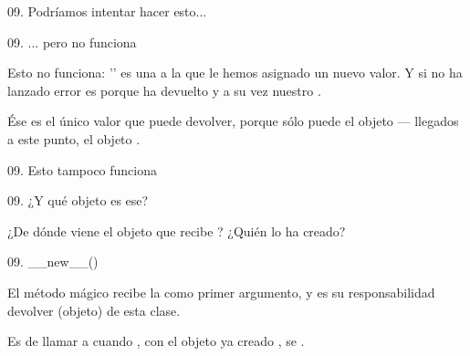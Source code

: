 \begin{frame}{09. Podríamos intentar hacer esto...}
  \footnotesize
\end{frame}

\begin{frame}{09. ... pero no funciona}
  \begin{center}
    Esto no funciona: '' es una  a la que le hemos asignado un nuevo valor. Y si no ha
    lanzado error es porque 
    ha devuelto  y a su vez nuestro
    .
  \end{center}

  \begin{block}{}
    \centering
    Ése es el único valor que  puede devolver,
    porque sólo puede  el objeto — llegados a
    este punto, el objeto .
  \end{block}
\end{frame}

\begin{frame}{09. Esto tampoco funciona}
  \scriptsize
\end{frame}

\begin{frame}{09. ¿Y qué objeto es ese?}
  \begin{center}
    \large
    ¿De dónde viene el objeto que recibe ?
    ¿Quién lo ha creado?
  \end{center}
\end{frame}

\begin{frame}{09. \_\_new\_\_()}
    \begin{block}{}
      \centering
      El método mágico  recibe la
       como primer argumento, y es su responsabilidad
      devolver  (objeto) de esta clase.
    \end{block}

    \begin{center}
      \small
      Es  de llamar a  cuando
      , con el objeto ya creado , se
      .
    \end{center}
\end{frame}

